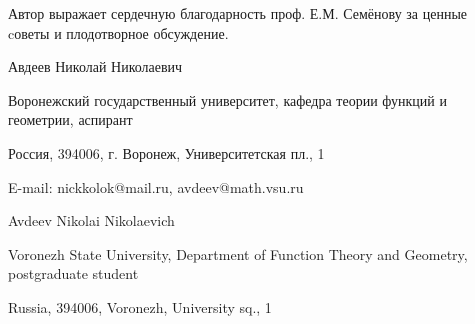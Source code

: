 \documentclass[a4paper,14pt]{article} %
\theoremstyle{plain}
\begin{document}
Автор выражает сердечную благодарность проф. Е.М. Семёнову за ценные cоветы и плодотворное обсуждение.

\printbibliography{}


Авдеев Николай Николаевич

Воронежский государственный университет, кафедра теории функций и геометрии, аспирант

Россия, 394006, г. Воронеж, Университетская пл., 1

E-mail: nickkolok@mail.ru, avdeev@math.vsu.ru


Avdeev Nikolai Nikolaevich

Voronezh State University, Department of Function Theory and Geometry, postgraduate student

Russia, 394006, Voronezh, University sq., 1
\end{document}
